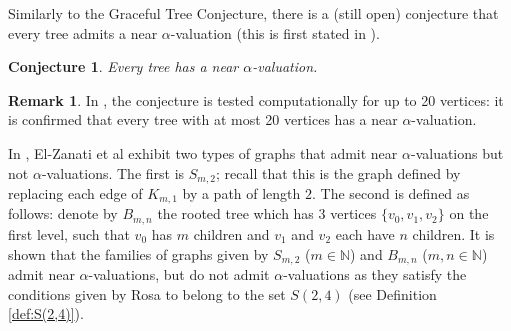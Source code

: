 \documentclass[12pt, a4paper]{article}
\newtheorem{conjecture}{Conjecture}
\theoremstyle{definition}
\newtheorem{remark}[theorem]{Remark}
\begin{document}
Similarly to the Graceful Tree Conjecture, there is a (still open) conjecture that every tree admits a near $\alpha$-valuation (this is first stated in \cite{El-Zanati}).

\begin{conjecture}\label{nearalphatree}
Every tree has a near $\alpha$-valuation.
\end{conjecture}

\begin{remark}\label{20nearalphatree}
In \cite{Grannell}, the conjecture is tested computationally for up to 20 vertices: it is confirmed that every tree with at most 20 vertices has a near $\alpha$-valuation.
\end{remark}

In \cite{El-Zanati}, El-Zanati et al exhibit two types of graphs that admit near $\alpha$-valuations but not $\alpha$-valuations. The first is $S_{m,2}$; recall that this is the graph defined by replacing each edge of $K_{m,1}$ by a path of length $2$.  The second is defined as follows:  denote by $B_{m,n}$ the rooted tree which has $3$ vertices $\{v_0,v_1,v_2\}$ on the first level, such that $v_0$ has $m$ children and $v_1$ and $v_2$ each have $n$ children.  It is shown that the families of graphs given by $S_{m,2}$ ($m \in \mathbb{N}$) and $B_{m,n}$ ($m,n \in \mathbb{N}$) admit near $\alpha$-valuations, but do not admit $\alpha$-valuations as they satisfy the conditions given by Rosa to belong to the set $S(2,4)$ (see Definition \ref{def:S(2,4)}).
\end{document}
